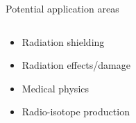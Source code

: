 \documentclass[xcolor=x11names,compress,handout]{beamer}
\renewcommand{\(}{\begin{columns}}
\renewcommand{\)}{\end{columns}}
\newcommand{\<}[1]{\begin{column}{#1}}
\renewcommand{\>}{\end{column}}
\begin{document}
\begin{frame}{Potential application areas}
  \begin{columns}
    \begin{column}{0.5\linewidth}
      \begin{itemize}
        \item Radiation shielding
        \item Radiation effects/damage
        \item Medical physics
        \item Radio-isotope production
      \end{itemize}
      \renewcommand*{\thesubfigure}{}
      \vspace{-0.5cm}
      \begin{figure}[htp]
        \centering
        \subcapcentertrue
      \end{figure}
    \end{column}
    

\end{columns}
\end{frame}
\end{document}
